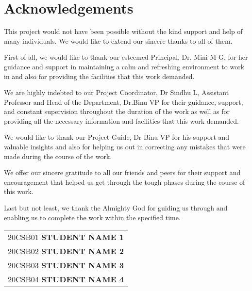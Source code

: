 \chapter*{Acknowledgements}

This project would not have been possible without the kind support and help of many individuals. We would like to extend our sincere thanks to all of them.

First of all, we would like to thank our esteemed Principal, Dr. Mini M G, for her guidance and support in maintaining a calm and refreshing environment to work in and also for providing the facilities that this work demanded.

We are highly indebted to our Project Coordinator, Dr Sindhu L, Assistant Professor and Head of the Department, Dr.Binu VP for their guidance, support, and constant supervision throughout the duration of the work as well as for providing all the necessary information and facilities that this work demanded.

We would like to thank our Project Guide, Dr Binu VP for his support and valuable insights and also for helping us out in correcting any mistakes that were made during the course of the work.

We offer our sincere gratitude to all our friends and peers for their support and encouragement that helped us get through the tough phases during the course of this work.

Last but not least, we thank the Almighty God for guiding us through and enabling us to complete the work within the specified time.

\vspace{2cm}

\begin{flushright}
\begin{tabular}{l}
20CSB01 \quad \textbf{STUDENT NAME 1}\\
20CSB02 \quad \textbf{STUDENT NAME 2}\\
20CSB03 \quad \textbf{STUDENT NAME 3}\\
20CSB04 \quad \textbf{STUDENT NAME 4}\\
\end{tabular}
\end{flushright}